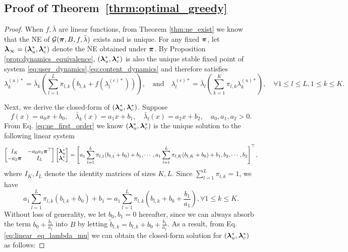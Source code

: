 \subsection{Proof of Theorem~\ref{thrm:optimal_greedy}} \label{app:optimal_greedy}
\begin{proof}

When $f,\bar{\lambda}$ are linear functions, from Theorem \ref{thm:ne_exist} we know that the NE of $\mathcal{G}(\bm{\pi}, B, f, \bar{\lambda})$ exists and is unique. For any fixed $\bm{\pi}$, let $\bm{\lambda}_{\infty}=(\bm{\lambda}_u^*,\bm{\lambda}_c^*)$ denote the NE obtained under $\bm{\pi}$. By Proposition \ref{prop:dynamics_equivalence}, $(\bm{\lambda}_u^*,\bm{\lambda}_c^*)$ is also the unique stable fixed point of system \eqref{eq:user_dynamics},\eqref{eq:content_dynamics} and therefore satisfies
\begin{equation}\label{eq:ne_first_order}
    \lambda_{k}^{(u)*} = \bar{\lambda}_k\left(\sum_{l=1}^L \pi_{l,k}\left(b_{l,k}+f(\lambda_l^{(c)*})\right)\right),  \quad \text{and}\quad\lambda_l^{(c)*}=\bar{\lambda}_l\left(\sum_{k=1}^K \pi_{l,k}\lambda_k^{(u)*}\right), \quad\forall 1\leq l\leq L, 1\leq k\leq K.
\end{equation}

Next, we derive the closed-form of $(\bm{\lambda}_u^*,\bm{\lambda}_c^*)$. Suppose 
$$f(x)=a_0 x+b_0, \quad\bar{\lambda}_k(x)=a_1 x+b_1, \quad\bar{\lambda}_l(x)=a_2 x+b_2, \quad a_0,a_1,a_2>0.$$ From Eq. \eqref{eq:ne_first_order} we know $(\bm{\lambda}_u^*,\bm{\lambda}_c^*)$ is the unique solution to the following linear system
\begin{equation}\label{eq:linear_eq_lambda_mu}
    \begin{bmatrix}
        I_K & -a_0a_1\bm{\pi}^{\top} \\
        -a_2\bm{\pi} & I_L
    \end{bmatrix}
    \begin{bmatrix}
        \bm{\lambda}_u^*  \\
        \bm{\lambda}_c^*
\end{bmatrix}=\left[a_1\sum_{l=1}^L\pi_{l,1}(b_{l,1}+b_0)+b_1,\cdots,a_1\sum_{l=1}^L\pi_{l,K}(b_{l,K}+b_0)+b_1,b_2,\cdots,b_2\right]^{\top},
\end{equation}
where $I_K,I_L$ denote the identity matrices of sizes $K,L$. Since $\sum_{l=1}^L \pi_{l,k}=1$, we have 
$$a_1\sum_{l=1}^L\pi_{l,k}(b_{l,k}+b_0)+b_1=a_1\sum_{l=1}^L\pi_{l,k}\left(b_{l,k}+b_0+\frac{b_1}{a_1}\right), \forall 1\leq k\leq K.$$
Without loss of generality, we let $b_0,b_1=0$ hereafter, since we can always absorb the term $b_0+\frac{b_1}{a_1}$ into $B$ by letting $\tilde{b}_{l,k}=b_{l,k}+b_0+\frac{b_1}{a_1}$. As a result, from Eq. \eqref{eq:linear_eq_lambda_mu} we can obtain the closed-form solution for $(\bm{\lambda}_u^*,\bm{\lambda}_c^*)$ as follows:


\end{proof}
